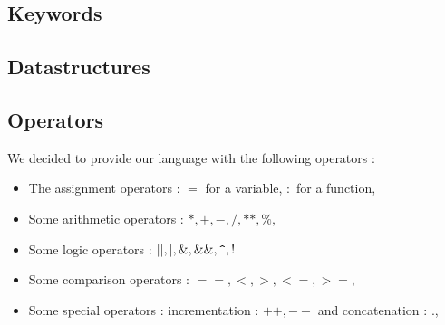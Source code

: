 \documentclass[a4paper,titlepage]{article}
\begin{document}
  \subsection{Keywords}



  \subsection{Datastructures}




  \subsection{Operators}
We decided to provide our language with the following operators :
\begin{itemize}
	\item The assignment operators : $ = $ for a variable, $ : $ for a function,
	\item Some arithmetic operators : $*, +, -, /, **, \%,$
	\item Some logic operators : $||, |, \&, \&\&, \verb+^+, !$
	\item Some comparison operators : $==, <, >, <=, >=,$
	\item Some special operators : incrementation : $++, --$ and concatenation : $.$, 
\end{itemize}


\newpage
\end{document}
